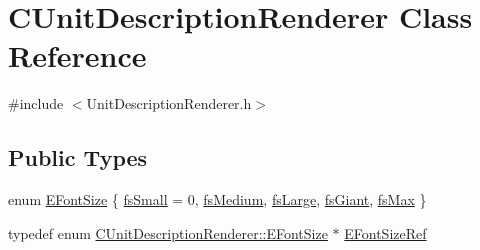 \hypertarget{classCUnitDescriptionRenderer}{}\section{C\+Unit\+Description\+Renderer Class Reference}
\label{classCUnitDescriptionRenderer}


{\ttfamily \#include $<$Unit\+Description\+Renderer.\+h$>$}

\subsection*{Public Types}
\begin{DoxyCompactItemize}
\item 
enum \hyperlink{classCUnitDescriptionRenderer_a3ea4cd83b6dd9533ab3abb953a7da35a}{E\+Font\+Size} \{ \newline
\hyperlink{classCUnitDescriptionRenderer_a3ea4cd83b6dd9533ab3abb953a7da35aaa0ab2dd25d9db891e7a7158795b46c63}{fs\+Small} = 0, 
\hyperlink{classCUnitDescriptionRenderer_a3ea4cd83b6dd9533ab3abb953a7da35aa7b5aa12d8a01b317ebfbf1bd65d7e568}{fs\+Medium}, 
\hyperlink{classCUnitDescriptionRenderer_a3ea4cd83b6dd9533ab3abb953a7da35aaf467097fe4f4811a5e2f1959c86e071d}{fs\+Large}, 
\hyperlink{classCUnitDescriptionRenderer_a3ea4cd83b6dd9533ab3abb953a7da35aa6194fc38e2cf8a4f891a90cbed5eafdd}{fs\+Giant}, 
\newline
\hyperlink{classCUnitDescriptionRenderer_a3ea4cd83b6dd9533ab3abb953a7da35aa74218e4708bac1eab359099eb0b159b2}{fs\+Max}
 \}
\item 
typedef enum \hyperlink{classCUnitDescriptionRenderer_a3ea4cd83b6dd9533ab3abb953a7da35a}{C\+Unit\+Description\+Renderer\+::\+E\+Font\+Size} $\ast$ \hyperlink{classCUnitDescriptionRenderer_a80d47a4b8bb5558bff5db296b614dd75}{E\+Font\+Size\+Ref}
\end{DoxyCompactItemize}
